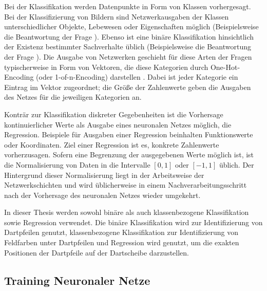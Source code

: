 Bei der Klassifikation werden Datenpunkte in Form von Klassen vorhergesagt. Bei der Klassifizierung von Bildern sind Netzwerkausgaben der Klassen unterschiedlicher Objekte, Lebewesen oder Eigenschaften möglich (Beispielsweise die Beantwortung der Frage ). Ebenso ist eine binäre Klassifikation hinsichtlich der Existenz bestimmter Sachverhalte üblich (Beispielsweise die Beantwortung der Frage ). Die Ausgabe von Netzwerken geschieht für diese Arten der Fragen typischerweise in Form von Vektoren, die diese Kategorien durch One-Hot-Encoding (oder 1-of-n-Encoding) darstellen \cite{one_hot_encoding}. Dabei ist jeder Kategorie ein Eintrag im Vektor zugeordnet; die Größe der Zahlenwerte geben die Ausgaben des Netzes für die jeweiligen Kategorien an.

Konträr zur Klassifikation diskreter Gegebenheiten ist die Vorhersage kontinuierlicher Werte als Ausgabe eines neuronalen Netzes möglich, die Regression. Beispiele für Ausgaben einer Regression beinhalten Funktionswerte oder Koordinaten. Ziel einer Regression ist es, konkrete Zahlenwerte vorherzusagen. Sofern eine Begrenzung der ausgegebenen Werte möglich ist, ist die Normalisierung von Daten in die Intervalle $[0, 1]$ oder $[-1, 1]$ üblich. Der Hintergrund dieser Normalisierung liegt in der Arbeitsweise der Netzwerkschichten und wird üblicherweise in einem Nachverarbeitungsschritt nach der Vorhersage des neuronalen Netzes wieder umgekehrt.

In dieser Thesis werden sowohl binäre als auch klassenbezogene Klassifikation sowie Regression verwendet. Die binäre Klassifikation wird zur Identifizierung von Dartpfeilen genutzt, klassenbezogene Klassifikation zur Identifizierung von Feldfarben unter Dartpfeilen und Regression wird genutzt, um die exakten Positionen der Dartpfeile auf der Dartscheibe darzustellen.


\subsection{Training Neuronaler Netze}
\label{sec:was_nn_training}

